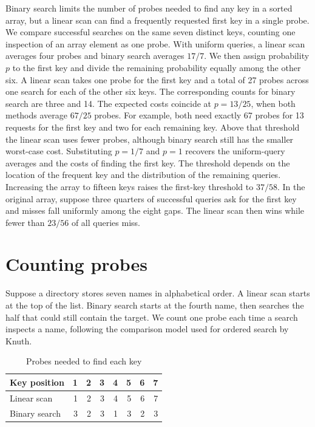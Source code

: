 \documentclass[lang=en]{fduthesis}
\begin{document}
\begin{fdusummaryen}
Binary search limits the number of probes needed to find any key in a sorted
array, but a linear scan can find a frequently requested first key in a single
probe. We compare successful searches on the same seven distinct keys, counting
one inspection of an array element as one probe. With uniform queries, a linear
scan averages four probes and binary search averages $17/7$. We then assign
probability $p$ to the first key and divide the remaining probability equally
among the other six. A linear scan takes one probe for the first key and
a total of 27 probes across one search for each of the other six keys. The corresponding counts for
binary search are three and 14. The expected costs coincide at $p=13/25$,
when both methods average $67/25$ probes. For example, both need exactly
67 probes for 13 requests for the first key and two for each remaining key. Above that threshold the linear scan
uses fewer probes, although binary search still has the smaller worst-case
cost. Substituting $p=1/7$ and $p=1$ recovers the uniform-query averages and
the costs of finding the first key. The threshold depends on the location of
the frequent key and the distribution of the remaining queries. Increasing the
array to fifteen keys raises the first-key threshold to $37/58$. In the original
array, suppose three quarters of successful queries ask for the first key and
misses fall uniformly among the eight gaps. The linear scan then wins while
fewer than $23/56$ of all queries miss.
\end{fdusummaryen}
\listoffigures
\listoftables

\mainmatter
\chapter{Counting probes}
Suppose a directory stores seven names in alphabetical order. A linear scan
starts at the top of the list. Binary search starts at the fourth name, then
searches the half that could still contain the target. We count one probe each
time a search inspects a name, following the comparison model used for ordered
search by Knuth\cite{knuth1998}.

\begin{table}[htbp]
  \centering
  \caption{Probes needed to find each key}\label{tab:counts}
  \begin{tabular}{lrrrrrrr}
    \toprule
    Key position & 1 & 2 & 3 & 4 & 5 & 6 & 7 \\
    \midrule
    Linear scan   & 1 & 2 & 3 & 4 & 5 & 6 & 7 \\
    Binary search & 3 & 2 & 3 & 1 & 3 & 2 & 3 \\
    \bottomrule
  \end{tabular}
\end{table}
\end{document}
